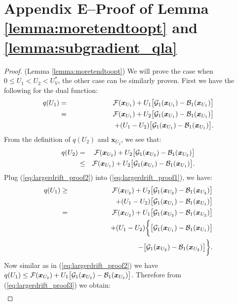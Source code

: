 \documentclass[journal]{IEEEtran}
\newcommand{\bv}[1]{{\boldsymbol{#1} }}
\newcommand{\script}[1]{{{\cal{#1} }}}
\begin{document}
\section*{Appendix E--Proof of Lemma \ref{lemma:moretendtoopt} and \ref{lemma:subgradient_qla}}
\begin{proof} (Lemma \ref{lemma:moretendtoopt})
We will prove the case when $0\leq U_1<U_2<U_V^*$, the other case can be similarly proven. First we have the following for the dual function:
\begin{eqnarray}
q(U_1)&=&\script{F}(\bv{x}_{U_1})+U_1\big[\script{G}_1(\bv{x}_{U_1})-\script{B}_1(\bv{x}_{U_1})\big]\label{eq:largerdrift_proof1}\\
&=&\script{F}(\bv{x}_{U_1})+U_2\big[\script{G}_1(\bv{x}_{U_1})-\script{B}_1(\bv{x}_{U_1})\big]\nonumber\\
&&\qquad\qquad\qquad+(U_1-U_2)\big[\script{G}_1(\bv{x}_{U_1})-\script{B}_1(\bv{x}_{U_1})\big].\nonumber
\end{eqnarray}
From the definition of $q(U_2)$ and $\bv{x}_{U_2}$, we see that:
\begin{eqnarray}
q(U_2)&=&\script{F}(\bv{x}_{U_2})+U_2\big[\script{G}_1(\bv{x}_{U_2})-\script{B}_1(\bv{x}_{U_2})\big]\nonumber\\
&\leq&\script{F}(\bv{x}_{U_1})+U_2\big[\script{G}_1(\bv{x}_{U_1})-\script{B}_1(\bv{x}_{U_1})\big].\label{eq:largerdrift_proof2}
\end{eqnarray}
Plug (\ref{eq:largerdrift_proof2}) into (\ref{eq:largerdrift_proof1}), we have: 
\begin{eqnarray}
q(U_1)&\geq&\script{F}(\bv{x}_{U_2})+U_2\big[\script{G}_1(\bv{x}_{U_2})-\script{B}_1(\bv{x}_{U_2})\big]\nonumber\\
&&\qquad\qquad\qquad+(U_1-U_2)\big[\script{G}_1(\bv{x}_{U_1})-\script{B}_1(\bv{x}_{U_1})\big]\nonumber\\
&=&\script{F}(\bv{x}_{U_2})+U_1\big[\script{G}_1(\bv{x}_{U_2})-\script{B}_1(\bv{x}_{U_2})\big]\nonumber\\
&&+(U_1-U_2)\bigg\{\big[\script{G}_1(\bv{x}_{U_1})-\script{B}_1(\bv{x}_{U_1})\big]\label{eq:largerdrift_proof3}\\
&&\qquad\qquad\qquad\qquad-\big[\script{G}_1(\bv{x}_{U_2})-\script{B}_1(\bv{x}_{U_2})\big]\bigg\}.\nonumber
\end{eqnarray}
Now similar as in (\ref{eq:largerdrift_proof2}) we have $q(U_1)\leq \script{F}(\bv{x}_{U_2})+U_1\big[\script{G}_1(\bv{x}_{U_2})-\script{B}_1(\bv{x}_{U_2})\big]$.  Therefore from (\ref{eq:largerdrift_proof3}) we obtain:
\begin{eqnarray*}

\end{eqnarray*}
\end{proof}
\end{document}
